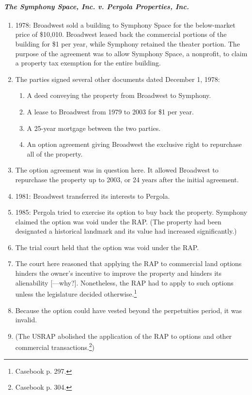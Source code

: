 \paragraph{\emph{The Symphony Space, Inc. v. Pergola Properties, Inc.}}

\begin{enumerate}
    \item 1978: Broadwest sold a building to Symphony Space for the 
    below-market price of \$10,010. Broadwest leased back the commercial 
    portions of the building for \$1 per year, while Symphony retained the 
    theater portion.  The purpose of the agreement was to allow Symphony 
    Space, a nonprofit, to claim a property tax exemption for the entire 
    building.
    \item The parties signed several other documents dated December 1, 1978:
    \begin{enumerate}
        \item A deed conveying the property from Broadwest to Symphony.
        \item A lease to Broadwest from 1979 to 2003 for \$1 per year.
        \item A 25-year mortgage between the two parties.
        \item An option agreement giving Broadwest the exclusive right to 
        repurchase all of the property.
    \end{enumerate}
    \item The option agreement was in question here. It allowed Broadwest to 
    repurchase the property up to 2003, or 24 years after the initial 
    agreement.
    \item 1981: Broadwest transferred its interests to Pergola.
    \item 1985: Pergola tried to exercise its option to buy back the property. 
    Symphony claimed the option was void under the RAP. (The property had been 
    designated a historical landmark and its value had increased 
    significantly.)
    \item The trial court held that the option was void under the RAP.
    \item The court here reasoned that applying the RAP to commercial land 
    options hinders the owner's incentive to improve the property and hinders 
    its alienability [---why?]. Nonetheless, the RAP had to apply to such 
    options unless the legislature decided otherwise.\footnote{Casebook p. 
    297.}
    \item Because the option could have vested beyond the perpetuities period, 
    it was invalid.
    \item (The USRAP abolished the application of the RAP to options and other 
    commercial transactions.\footnote{Casebook p. 304.})
\end{enumerate}

